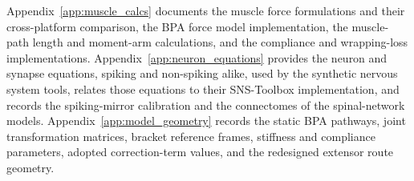 Appendix~\ref{app:muscle_calcs} documents the muscle force formulations and their cross-platform comparison, the BPA force model implementation, the muscle-path length and moment-arm calculations, and the compliance and wrapping-loss implementations. Appendix~\ref{app:neuron_equations} provides the neuron and synapse equations, spiking and non-spiking alike, used by the synthetic nervous system tools, relates those equations to their SNS-Toolbox implementation, and records the spiking-mirror calibration and the connectomes of the spinal-network models. Appendix~\ref{app:model_geometry} records the static BPA pathways, joint transformation matrices, bracket reference frames, stiffness and compliance parameters, adopted correction-term values, and the redesigned extensor route geometry.
